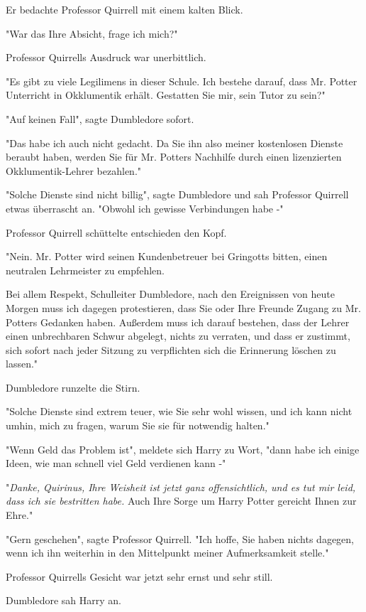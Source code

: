 {Er bedachte Professor Quirrell mit einem kalten Blick.

"War das Ihre Absicht, frage ich mich?"

Professor Quirrells Ausdruck war unerbittlich.

"Es gibt zu viele Legilimens in dieser Schule. Ich bestehe darauf, dass Mr. Potter Unterricht in Okklumentik erhält. Gestatten Sie mir, sein Tutor zu sein?"

"Auf keinen Fall", sagte Dumbledore sofort.

"Das habe ich auch nicht gedacht. Da Sie ihn also meiner kostenlosen Dienste beraubt haben, werden Sie für Mr. Potters Nachhilfe durch einen lizenzierten Okklumentik-Lehrer bezahlen."

"Solche Dienste sind nicht billig", sagte Dumbledore und sah Professor Quirrell etwas überrascht an. "Obwohl ich gewisse Verbindungen habe -"

Professor Quirrell schüttelte entschieden den Kopf.

"Nein. Mr. Potter wird seinen Kundenbetreuer bei Gringotts bitten, einen neutralen Lehrmeister zu empfehlen.

Bei allem Respekt, Schulleiter Dumbledore, nach den Ereignissen von heute Morgen muss ich dagegen protestieren, dass Sie oder Ihre Freunde Zugang zu Mr. Potters Gedanken haben. Außerdem muss ich darauf bestehen, dass der Lehrer einen unbrechbaren Schwur abgelegt, nichts zu verraten, und dass er zustimmt, sich sofort nach jeder Sitzung zu verpflichten sich die Erinnerung löschen zu lassen."

Dumbledore runzelte die Stirn.

"Solche Dienste sind extrem teuer, wie Sie sehr wohl wissen, und ich kann nicht umhin, mich zu fragen, warum Sie sie für notwendig halten."

"Wenn Geld das Problem ist", meldete sich Harry zu Wort, "dann habe ich einige Ideen, wie man schnell viel Geld verdienen kann -"

"\emph{Danke, Quirinus, Ihre Weisheit ist jetzt ganz offensichtlich, und es tut mir leid, dass ich sie bestritten habe.} Auch Ihre Sorge um Harry Potter gereicht Ihnen zur Ehre."

"Gern geschehen", sagte Professor Quirrell. "Ich hoffe, Sie haben nichts dagegen, wenn ich ihn weiterhin in den Mittelpunkt meiner Aufmerksamkeit stelle."

Professor Quirrells Gesicht war jetzt sehr ernst und sehr still.

Dumbledore sah Harry an.

}
